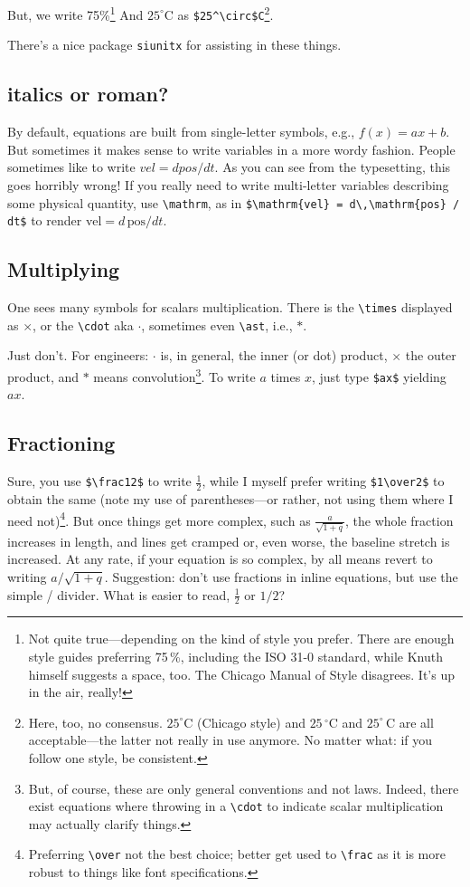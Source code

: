\documentclass{article}
\begin{document}
But, we write 75\%\footnote{Not quite true---depending on the kind of style you prefer.  There are enough style guides preferring 75\,\%, including the ISO 31-0 standard, while Knuth himself suggests a space, too.  The Chicago Manual of Style disagrees.  It's up in the air, really!} And $25^\circ$C as \verb+$25^\circ$C+\footnote{Here, too, no consensus.  $25^\circ$C (Chicago style) and $25\,^\circ$C and $25^\circ\,$C are all acceptable---the latter not really in use anymore.  No matter what: if you follow one style, be consistent.}.

There's a nice package \texttt{siunitx} for assisting in these things. 

\subsection{italics or roman?}
By default, equations are built from single-letter symbols, e.g., $f(x) = ax+b$.  But sometimes it makes sense to write variables in a more wordy fashion.  People sometimes like to write $vel = d pos / d t$.  As you can see from the typesetting, this goes horribly wrong!  If you really need to write multi-letter variables describing some physical quantity, use \verb+\mathrm+, as in \verb+$\mathrm{vel} = d\,\mathrm{pos} / dt$+ to render $\mathrm{vel} = d\, \mathrm{pos} / dt$.

\subsection{Multiplying}
One sees many symbols for scalars multiplication.  There is the \verb+\times+ displayed as $\times$, or the \verb+\cdot+ aka $\cdot$, sometimes even \verb+\ast+, i.e., $\ast$.

Just don't.  For engineers: $\cdot$ is, in general, the inner (or dot) product, $\times$ the  outer product, and $\ast$ means convolution\footnote{But, of course, these are only general conventions and not laws.  Indeed, there exist equations where throwing in a \verb+\cdot+ to indicate scalar multiplication may actually clarify things.}. To write $a$ times $x$, just type \verb+$ax$+ yielding $ax$.


\subsection{Fractioning}
Sure, you use \verb+$\frac12$+ to write $\frac12$, while I myself prefer writing \verb+$1\over2$+ to obtain the same (note my use of parentheses---or rather, not using them where I need not)\footnote{Preferring \verb+\over+ not the best choice; better get used to \verb+\frac+ as it is more robust to things like font specifications.}.  But once things get more complex, such as $\frac a{\sqrt{1+q}}$, the whole fraction increases in length, and lines get cramped or, even worse, the baseline stretch is increased. At any rate, if your equation is so complex, by all means revert to writing $a/{\sqrt{1+q}}$.   Suggestion: don't use fractions in inline equations, but use the simple / divider.  What is easier to read, $\frac12$ or $1/2$?
\end{document}
